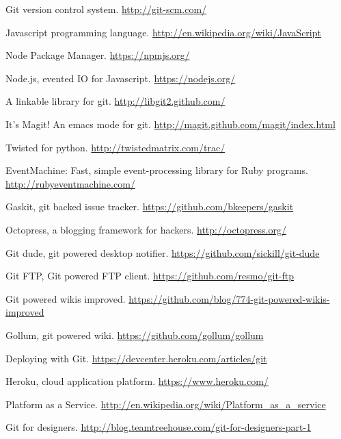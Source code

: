 \cleardoublepage
{}
{}

\begin{thebibliography}{99}

 Git version control system.
  \url{http://git-scm.com/}

 Javascript programming language.
  \url{http://en.wikipedia.org/wiki/JavaScript}

 Node Package Manager.
  \url{https://npmjs.org/}

 Node.js, evented IO for Javascript.
  \url{https://nodejs.org/}

 A linkable library for git.
  \url{http://libgit2.github.com/}

 It's Magit! An emacs mode for git.
  \url{http://magit.github.com/magit/index.html}

 Twisted for python.
  \url{http://twistedmatrix.com/trac/}

 EventMachine: Fast, simple event-processing library for
  Ruby programs. \url{http://rubyeventmachine.com/}

 Gaskit, git backed issue tracker.
  \url{https://github.com/bkeepers/gaskit}

 Octopress, a blogging framework for hackers.
  \url{http://octopress.org/}

 Git dude, git powered desktop notifier.
  \url{https://github.com/sickill/git-dude}

 Git FTP, Git powered FTP client.
  \url{https://github.com/resmo/git-ftp}

 Git powered wikis improved.
  \url{https://github.com/blog/774-git-powered-wikis-improved}

 Gollum, git powered wiki.
  \url{https://github.com/gollum/gollum}

 Deploying with Git.
  \url{https://devcenter.heroku.com/articles/git}

 Heroku, cloud application platform.
  \url{https://www.heroku.com/}

 Platform as a Service.
  \url{http://en.wikipedia.org/wiki/Platform_as_a_service}

 Git for designers.
  \url{http://blog.teamtreehouse.com/git-for-designers-part-1}


\end{thebibliography}
